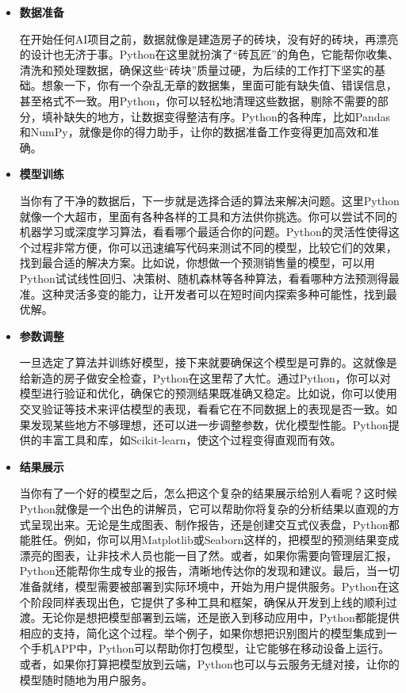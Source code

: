 \begin{itemize}
\item \textbf{数据准备}

在开始任何AI项目之前，数据就像是建造房子的砖块，没有好的砖块，再漂亮的设计也无济于事。Python在这里就扮演了“砖瓦匠”的角色，它能帮你收集、清洗和预处理数据，确保这些“砖块”质量过硬，为后续的工作打下坚实的基础。想象一下，你有一个杂乱无章的数据集，里面可能有缺失值、错误信息，甚至格式不一致。用Python，你可以轻松地清理这些数据，剔除不需要的部分，填补缺失的地方，让数据变得整洁有序。Python的各种库，比如Pandas和NumPy，就像是你的得力助手，让你的数据准备工作变得更加高效和准确。


\item \textbf{模型训练}

当你有了干净的数据后，下一步就是选择合适的算法来解决问题。这里Python就像一个大超市，里面有各种各样的工具和方法供你挑选。你可以尝试不同的机器学习或深度学习算法，看看哪个最适合你的问题。Python的灵活性使得这个过程非常方便，你可以迅速编写代码来测试不同的模型，比较它们的效果，找到最合适的解决方案。比如说，你想做一个预测销售量的模型，可以用Python试试线性回归、决策树、随机森林等各种算法，看看哪种方法预测得最准。这种灵活多变的能力，让开发者可以在短时间内探索多种可能性，找到最优解。

\item \textbf{参数调整}

一旦选定了算法并训练好模型，接下来就要确保这个模型是可靠的。这就像是给新造的房子做安全检查，Python在这里帮了大忙。通过Python，你可以对模型进行验证和优化，确保它的预测结果既准确又稳定。比如说，你可以使用交叉验证等技术来评估模型的表现，看看它在不同数据上的表现是否一致。如果发现某些地方不够理想，还可以进一步调整参数，优化模型性能。Python提供的丰富工具和库，如Scikit-learn，使这个过程变得直观而有效。

\item \textbf{结果展示}

当你有了一个好的模型之后，怎么把这个复杂的结果展示给别人看呢？这时候Python就像是一个出色的讲解员，它可以帮助你将复杂的分析结果以直观的方式呈现出来。无论是生成图表、制作报告，还是创建交互式仪表盘，Python都能胜任。例如，你可以用Matplotlib或Seaborn这样的，把模型的预测结果变成漂亮的图表，让非技术人员也能一目了然。或者，如果你需要向管理层汇报，Python还能帮你生成专业的报告，清晰地传达你的发现和建议。最后，当一切准备就绪，模型需要被部署到实际环境中，开始为用户提供服务。Python在这个阶段同样表现出色，它提供了多种工具和框架，确保从开发到上线的顺利过渡。无论你是想把模型部署到云端，还是嵌入到移动应用中，Python都能提供相应的支持，简化这个过程。举个例子，如果你想把识别图片的模型集成到一个手机APP中，Python可以帮助你打包模型，让它能够在移动设备上运行。或者，如果你打算把模型放到云端，Python也可以与云服务无缝对接，让你的模型随时随地为用户服务。
\end{itemize}

